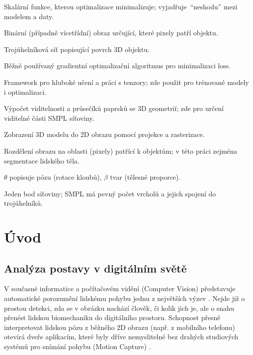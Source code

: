 \documentclass[11pt,a4paper,twoside,openright]{report}
\begin{document}
\begin{description}[style=nextline]
    \item[loss / ztrátová funkce] Skalární funkce, kterou optimalizace minimalizuje; vyjadřuje \,\enquote{neshodu} mezi modelem a daty.
    \item[maska] Binární (případně vícetřídní) obraz určující, které pixely patří objektu.
    \item[mesh / síťovina] Trojúhelníková síť popisující povrch 3D objektu.
    \item[optimalizátor Adam] Běžně používaný gradientní optimalizační algoritmus pro minimalizaci loss.
    \item[PyTorch] Framework pro hluboké učení a práci s tenzory; zde použit pro trénované modely i optimalizaci.
    \item[ray tracing] Výpočet viditelnosti a průsečíků paprsků se 3D geometrií; zde pro určení viditelné části SMPL síťoviny.
    \item[renderování] Zobrazení 3D modelu do 2D obrazu pomocí projekce a rasterizace.
    \item[segmentace] Rozdělení obrazu na oblasti (pixely) patřící k objektům; v této práci zejména segmentace lidského těla.
    \item[SMPL parametry $\theta$, $\beta$] $\theta$ popisuje pózu (rotace kloubů), $\beta$ tvar (tělesné proporce).
    \item[vrchol (vertex)] Jeden bod síťoviny; SMPL má pevný počet vrcholů a jejich spojení do trojúhelníků.
\end{description}

\chapter{Úvod}

\section{Analýza postavy v digitálním světě}

V současné informatice a počítačovém vidění (Computer Vision) představuje automatické porozumění lidskému pohybu jednu z největších výzev \cite{purkrabek2025detection}. Nejde již o prostou detekci, zda se v obrázku nachází člověk, či kolik jich je, ale o snahu přenést lidskou biomechaniku do digitálního prostoru. Schopnost přesně interpretovat lidskou pózu z běžného 2D obrazu (např. z mobilního telefonu) otevírá dveře aplikacím, které byly dříve nemyslitelné bez drahých studiových systémů pro snímání pohybu (Motion Capture) \cite{pavlakos2019expressive,wang2024prompthmr}.
\end{document}

